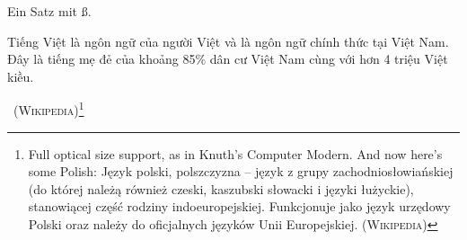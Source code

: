 \documentclass{article}
\begin{document}
\blinddocument
\makeatletter

Ein Satz mit ß.

\textsf{\blindtext}

\texttt{\blindtext}

\lipsum

\begin{otherlanguage}{vietnamese}
Tiếng Việt là ngôn ngữ của người Việt và là ngôn ngữ chính thức tại Việt Nam. Đây là tiếng mẹ đẻ của khoảng 85\% dân cư Việt Nam cùng với hơn 4 triệu Việt kiều.\end{otherlanguage}\ (\textsc{Wikipedia})\footnote{Full optical size support, as in Knuth's Computer Modern. And now here's some Polish: \foreignlanguage{polish}{Język polski, polszczyzna – język z grupy zachodniosłowiańskiej (do której należą również czeski, kaszubski słowacki i języki łużyckie), stanowiącej część rodziny indoeuropejskiej. Funkcjonuje jako język urzędowy Polski oraz należy do oficjalnych języków Unii Europejskiej.} (\textsc{Wikipedia})}
\end{document}
